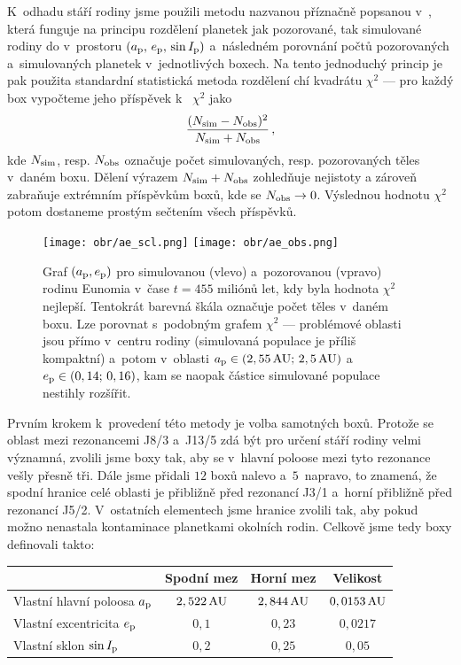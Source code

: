 \documentclass[A4paper, 12pt, oneside]{book}
\begin{document}
K~odhadu stáří rodiny jsme použili metodu nazvanou příznačně  popsanou v~\cite{broz19}, která funguje na principu rozdělení planetek jak pozorované, tak simulované rodiny do  v~prostoru $(a_{\rm p},\,e_{\rm p},\,\sin I_{\rm p})$ a~následném porovnání počtů pozorovaných a~simulovaných planetek v~jednotlivých boxech. Na tento jednoduchý princip je pak použita standardní statistická metoda rozdělení chí kvadrátu $\chi^2$ --- pro každý box vypočteme jeho příspěvek k~ $\chi^2$ jako
\begin{align}
	\frac{(N_{\rm sim}-N_{\rm obs})^2}{N_{\rm sim}+N_{\rm obs}}\,,
\end{align}
kde $N_{\rm sim}$, resp. $N_{\rm obs}$ označuje počet simulovaných, resp. pozorovaných těles v~daném boxu. Dělení výrazem $N_{\rm sim}+N_{\rm obs}$ zohledňuje nejistoty a zároveň zabraňuje extrémním příspěvkům boxů, kde se $N_{\rm obs}\rightarrow 0$. Výslednou hodnotu $\chi^2$ potom dostaneme prostým sečtením všech příspěvků.

\immediate{}
\immediate{}
\begin{figure}
	\centering
	\texttt{[image: obr/ae\_scl.png]}
	\texttt{[image: obr/ae\_obs.png]}\\
	\caption{Graf $(a_{\rm p}, e_{\rm p})$ pro simulovanou (vlevo) a~pozorovanou (vpravo) rodinu Eunomia v~čase $t=455$ miliónů let, kdy byla hodnota $\chi^2$ nejlepší. Tentokrát barevná škála označuje počet těles v~daném boxu. Lze porovnat s~podobným grafem $\chi^2$ --- problémové oblasti jsou přímo v~centru rodiny (simulovaná populace je příliš kompaktní) a~potom v~oblasti $a_{\rm p}\in(2,55\,{\rm AU};\,2,5\,{\rm AU})$ a~$e_{\rm p}\in(0,14;\,0,16)$, kam se naopak částice simulované populace nestihly rozšířit.} \label{fig:ae_obs_scl}
\end{figure}

Prvním krokem k~provedení této metody je volba samotných boxů. Protože se oblast mezi rezonancemi J8/3 a~J13/5 zdá být pro určení stáří rodiny velmi významná, zvolili jsme boxy tak, aby se v~hlavní poloose mezi tyto rezonance vešly přesně tři. Dále jsme přidali $12$ boxů nalevo a~$5$~napravo, to znamená, že spodní hranice celé oblasti je přibližně před rezonancí J3/1 a~horní přibližně před rezonancí J5/2. V~ostatních elementech jsme hranice zvolili tak, aby pokud možno nenastala kontaminace planetkami okolních rodin. Celkově jsme tedy boxy definovali takto:

\begin{center}
\begin{tabularx}{0.8\textwidth}{|X||c|c|c|}
	\hline
	& Spodní mez & Horní mez & Velikost  \\
	\hline \hline
	Vlastní hlavní poloosa $a_{\rm p}$ & $2,522\,{\rm AU}$ & $2,844\,{\rm AU}$ & $0,0153\,{\rm AU}$ \\
	\hline
	Vlastní excentricita $e_{\rm p}$ & $0,1$ & $0,23$ & $0,0217$ \\
	\hline
	Vlastní sklon $\sin I_{\rm p}$ & $0,2$ & $0,25$ & $0,05$ \\
	\hline
\end{tabularx}
\end{center}
\end{document}
